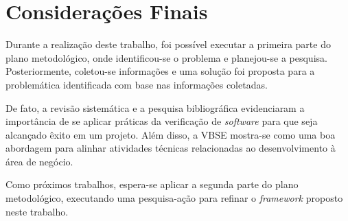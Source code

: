 \chapter{Considerações Finais}

Durante a realização deste trabalho, foi possível executar a primeira parte do plano metodológico, onde identificou-se o problema e planejou-se a pesquisa. Posteriormente, coletou-se informações e uma solução foi proposta para a problemática identificada com base nas informações coletadas.

De fato, a revisão sistemática e a pesquisa bibliográfica evidenciaram a importância de se aplicar práticas da verificação de \textit{software} para que seja alcançado êxito em um projeto. Além disso, a VBSE mostra-se como uma boa abordagem para alinhar atividades técnicas relacionadas ao desenvolvimento à área de negócio.

Como próximos trabalhos, espera-se aplicar a segunda parte do plano metodológico, executando uma pesquisa-ação para refinar o \textit{framework} proposto neste trabalho.